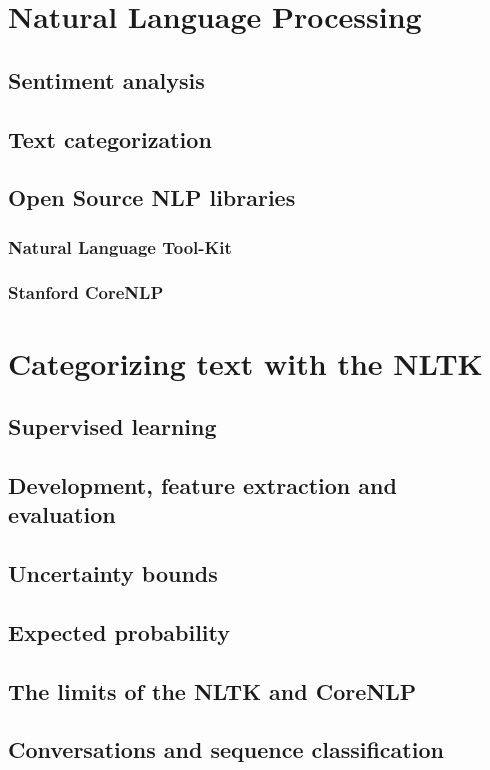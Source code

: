 \documentclass[12pt, twoside, a4paper, draft]{report}
\begin{document}
\section{Natural Language Processing}
\subsection{Sentiment analysis}
\subsection{Text categorization}
\subsection{Open Source NLP libraries}
\subsubsection{Natural Language Tool-Kit}
\subsubsection{Stanford CoreNLP}
\section{Categorizing text with the NLTK}
\subsection{Supervised learning}
\subsection{Development, feature extraction and evaluation}
\subsection{Uncertainty bounds}
\subsection{Expected probability}
\subsection{The limits of the NLTK and CoreNLP}
\subsection{Conversations and sequence classification}
\end{document}
